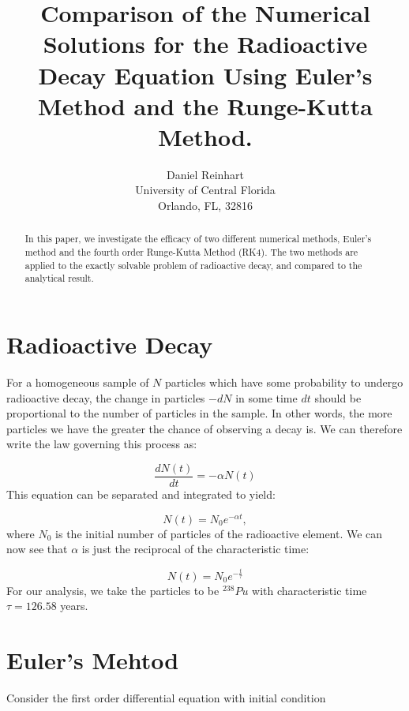\documentclass{article}
\begin{document}
	\title{Comparison of the Numerical Solutions for the Radioactive Decay Equation Using Euler's Method and the Runge-Kutta Method.}
	\author{Daniel Reinhart \\ University of Central Florida \\ Orlando, FL, 32816}
	\date{}
	\affil{}
	
		\maketitle
	
\begin{abstract}
In this paper, we investigate the efficacy of two different numerical methods, Euler's method and the fourth order Runge-Kutta Method (RK4). The two methods are applied to the exactly solvable problem of radioactive decay, and compared to the analytical result.
\end{abstract}

\section{Radioactive Decay}
For a homogeneous sample of $N$ particles which have some probability to undergo radioactive decay, the change in particles $-dN$ in some time $dt$ should be proportional to the number of particles in the sample. In other words, the more particles we have the greater the chance of observing a decay is. We can therefore write the law governing this process as:

\begin{equation}
\frac{dN(t)}{dt}=-\alpha N(t)
\label{eqn1}
\end{equation}
This equation can be separated and integrated to yield:

\begin{equation}
N(t) = N_0 e^{-\alpha t},
\label{eqn2}
\end{equation}
where $N_0$ is the initial number of particles of the radioactive element. We can now see that $\alpha$ is just the reciprocal of the characteristic time:

\begin{equation}
N(t) = N_0 e^{-\frac{t}{\tau}}
\label{eqn3}
\end{equation}
For our analysis, we take the particles to be $^{238}Pu$ with characteristic time $\tau = 126.58 $ years.

\section{Euler's Mehtod}
Consider the first order differential equation with initial condition
\end{document}
